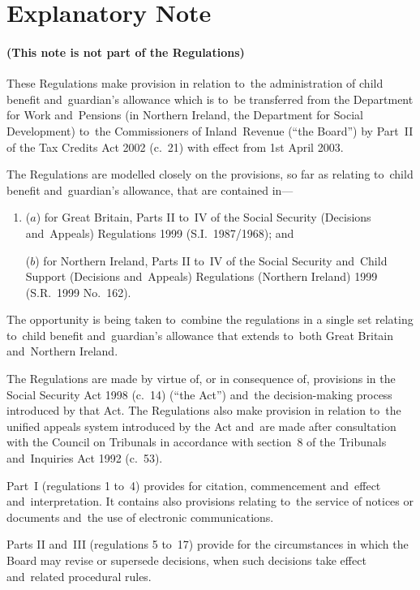 \documentclass[12pt,a4paper]{article}
\begin{document}
\part{Explanatory Note}

\renewcommand\parthead{— Explanatory Note}

\subsection*{(This note is not part of the Regulations)}

These Regulations make provision in relation to~the administration of child benefit and~guardian’s allowance which is to~be transferred from the Department for Work and~Pensions (in Northern Ireland, the Department for Social Development) to~the Commissioners of Inland~Revenue (“the Board”) by Part~II of the Tax Credits Act 2002 (c.~21) with effect from 1st April 2003.

The Regulations are modelled closely on the provisions, so far as relating to~child benefit and~guardian’s allowance, that are contained in—
\begin{enumerate}\item[]
($a$) for Great Britain, Parts II to~IV of the Social Security (Decisions and~Appeals) Regulations 1999 (S.I.~1987/1968); and

($b$) for Northern Ireland, Parts II to~IV of the Social Security and~Child Support (Decisions and~Appeals) Regulations (Northern Ireland) 1999 (S.R.~1999 No.~162).
\end{enumerate}

The opportunity is being taken to~combine the regulations in a single set relating to~child benefit and~guardian’s allowance that extends to~both Great Britain and~Northern Ireland.

The Regulations are made by virtue of, or in consequence of, provisions in the Social Security Act 1998 (c.~14) (“the Act”) and~the decision-making process introduced by that Act. The Regulations also make provision in relation to~the unified appeals system introduced by the Act and~are made after consultation with the Council on Tribunals in accordance with section~8 of the Tribunals and~Inquiries Act 1992 (c.~53).

Part~I (regulations 1 to~4) provides for citation, commencement and~effect and~interpretation. It contains also provisions relating to~the service of notices or documents and~the use of electronic communications.

Parts II and~III (regulations 5 to~17) provide for the circumstances in which the Board may revise or supersede decisions, when such decisions take effect and~related procedural rules.
\end{document}
